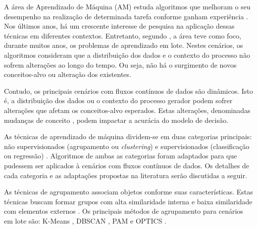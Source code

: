 \documentclass[qual, classic, a4paper]{ufbathesis}
\begin{document}
A área de Aprendizado de Máquina (AM) estuda algoritmos que melhoram o seu desempenho na realização de determinada tarefa conforme ganham experiência \cite{Mitchell:1997:ML:541177}.
Nos últimos anos, há um crescente interesse de pesquisa na aplicação dessas técnicas em diferentes contextos.
Entretanto, segundo \cite{Gama:2010:KDD:1855075}, a área teve como foco, durante muitos anos, os problemas de aprendizado em lote.
Nestes cenários, os algoritmos consideram que a distribuição dos dados e o contexto do processo não sofrem alterações ao longo do tempo.
Ou seja, não há o surgimento de novos conceitos-alvo ou alteração dos existentes.

Contudo, os principais cenários com fluxos contínuos de dados são dinâmicos.
Isto é, a distribuição dos dados ou o contexto do processo gerador podem sofrer alterações que afetam os conceitos-alvo esperados.
Estas alterações, denominadas mudanças de conceito \cite{Gama:2010:KDD:1855075}, podem impactar a acurácia do modelo de decisão.



As técnicas de aprendizado de máquina dividem-se em duas categorias principais: 
não supervisionados (agrupamento ou \textit{clustering}) e supervisionados (classificação ou regressão) \cite{Mitchell:1997:ML:541177}.
Algoritmos de ambas as categorias foram adaptados para que pudessem ser aplicados à cenários com fluxos contínuos de dados.
Os detalhes de cada categoria e as adaptações propostas na literatura serão discutidas a seguir.

As técnicas de agrupamento associam objetos conforme suas características.
Estas técnicas buscam formar grupos com alta similaridade interna e baixa similaridade com elementos externos \cite{Jain:1988:ACD:46712}.
Os principais métodos de agrupamento para cenários em lote são:
K-Means \cite{Lloyd:2006:LSQ:2263356.2269955},
DBSCAN \cite{Ester:1996:DAD:3001460.3001507},
PAM \cite{kaufman:clustering1990} e 
OPTICS \cite{Ankerst:1999:OOP:304181.304187}.
\end{document}
